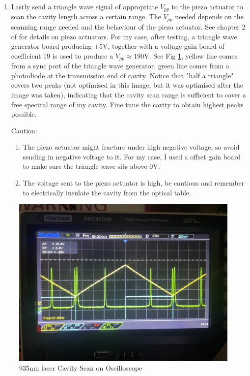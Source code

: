 \documentclass[12pt]{report}
\begin{document}
\begin{enumerate}
    \item Lastly send a triangle wave signal of appropriate $V_{pp}$ to the piezo actuator to scan the cavity length across a certain range. The $V_{pp}$ needed depends on the scanning range needed and the behaviour of the piezo actuator. See chapter 2 of \cite{FundamentalPrinciplesofEngineeringNanometrology} for details on piezo actuators. For my case, after testing, a triangle wave generator board producing $\pm 5$V, together with a voltage gain board of coefficient 19 is used to produce a $V_{pp} \approx 190$V. See Fig \ref{fig:935cavityScan}, yellow line comes from a sync port of the triangle wave generator, green line comes from a photodiode at the transmission end of cavity. Notice that "half a triangle" covers two peaks (not optimised in this image, but it was optimised after the image was taken), indicating that the cavity scan range is sufficient to cover a free spectral range of my cavity. Fine tune the cavity to obtain highest peaks possible.
    \par
    Caution: 
    \begin{enumerate}
        \item The piezo actuator might fracture under high negative voltage, so avoid sending in negative voltage to it. For my case, I used a offset gain board to make sure the triangle wave sits above 0V.
        \item The voltage sent to the piezo actuator is high, be cautious and remember to electrically insulate the cavity from the optical table.
    \end{enumerate}
\end{enumerate}

\begin{figure}[H]
    \centering
    \includegraphics[width=.8\textwidth]{935cavityScan.jpeg}
    \caption{935nm laser Cavity Scan on Oscilloscope}
    \label{fig:935cavityScan}
\end{figure}
\end{document}
